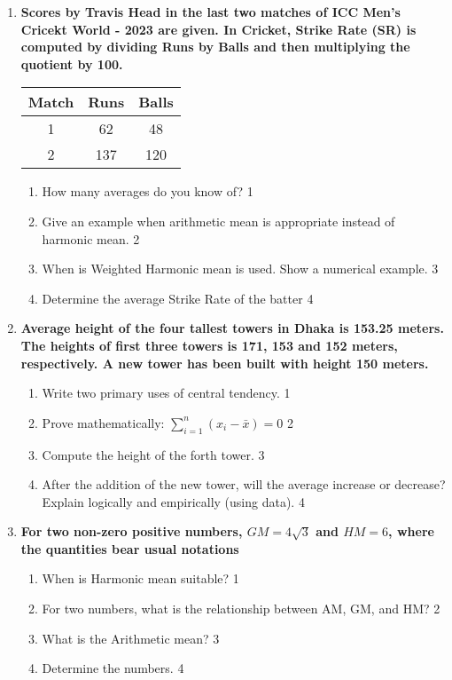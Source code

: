 \documentclass[a4paper,oneside]{book}
\begin{document}
\begin{enumerate}
 \item
	  \textbf{Scores by Travis Head in the last two matches of ICC Men's 
	  Cricekt World - 2023 are given. In Cricket, Strike Rate (SR) is computed by dividing Runs by Balls and then multiplying the quotient by 100.} 
	  
	  \begin{table}[h]
	  \centering
\begin{tabular}{c|c|c}
Match & Runs & Balls \\ \hline 
1 & 62 & 48 \\
2 & 137 & 120 \\ \hline 
\end{tabular}
\end{table}
  
  \begin{enumerate}
    \item
	How many averages do you know of? \hfill 1
    \item
	Give an example when arithmetic mean is appropriate instead of harmonic mean. \hfill 2
    \item  
	When is Weighted Harmonic mean is used. Show a numerical example. \hfill 3
    \item
	Determine the average Strike Rate of the batter \hfill 4
  \end{enumerate}
  
   \item
	  \textbf{Average height of the four tallest towers in Dhaka is 153.25 meters. The heights of first three towers is 171, 153 and 152 meters, respectively. A new tower has been built with height 150 meters.} 
  
  \begin{enumerate}
    \item
	Write two primary uses of central tendency. \hfill 1
    \item
	Prove mathematically: $\displaystyle \sum_{i=1}^n (x_i-\bar x) = 0$ \hfill 2
    \item  
	Compute the height of the forth tower. \hfill 3
    \item
	After the addition of the new tower, will the average increase or decrease? Explain logically and empirically (using data). \hfill 4
  \end{enumerate}

 \item
	  \textbf{For two non-zero positive numbers, $GM=4\sqrt3$ and $HM=6$, where the quantities bear usual notations} 
  
  \begin{enumerate}
    \item
	When is Harmonic mean suitable? \hfill 1
    \item
	For two numbers, what is the relationship between AM, GM, and HM? \hfill 2
    \item  
	What is the Arithmetic mean? \hfill 3
    \item
	Determine the numbers. \hfill 4
  \end{enumerate}
  

\end{enumerate}
\end{document}
